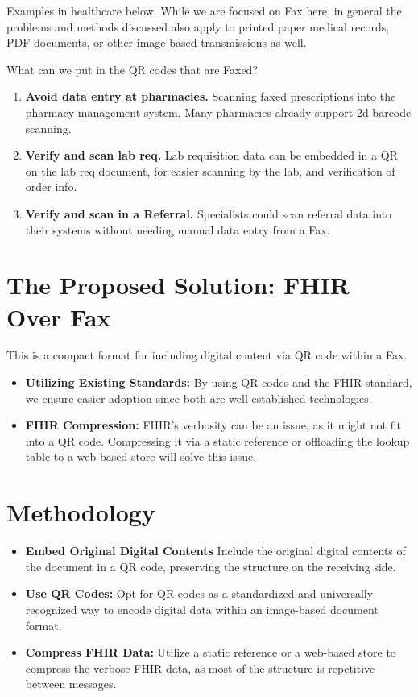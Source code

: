\documentclass[12pt,a4paper]{article}
\begin{document}
Examples in healthcare below. While we are focused on Fax here, in general the problems and methods discussed also apply to printed paper medical records, PDF documents, or other image based transmissions as well.

What can we put in the QR codes that are Faxed?
\begin{enumerate}[label=\arabic*.]
\item \textbf{Avoid data entry at pharmacies.}
Scanning faxed prescriptions into the pharmacy management system. Many pharmacies already support 2d barcode scanning.
\item \textbf{Verify and scan lab req.}
Lab requisition data can be embedded in a QR on the lab req document, for easier scanning by the lab, and verification of order info.
\item \textbf{Verify and scan in a Referral.}
Specialists could scan referral data into their systems without needing manual data entry from a Fax.
\end{enumerate}



\section{The Proposed Solution: FHIR Over Fax}
This is a compact format for including digital content via QR code within a Fax.

\begin{itemize}
\item \textbf{Utilizing Existing Standards:}
By using QR codes and the FHIR standard, we ensure easier adoption since both are well-established technologies.
\item \textbf{FHIR Compression:}
FHIR's verbosity can be an issue, as it might not fit into a QR code. Compressing it via a static reference or offloading the lookup table to a web-based store will solve this issue.
\end{itemize}

\section{Methodology}

\begin{itemize}
\item \textbf{Embed Original Digital Contents}
Include the original digital contents of the document in a QR code, preserving the structure on the receiving side.
\item \textbf{Use QR Codes:}
Opt for QR codes as a standardized and universally recognized way to encode digital data within an image-based document format.
\item \textbf{Compress FHIR Data:}
Utilize a static reference or a web-based store to compress the verbose FHIR data, as most of the structure is repetitive between messages.
\end{itemize}
\end{document}

